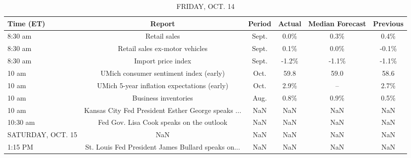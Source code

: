 \documentclass{article}%
\begin{document}
%


\begin{table}[htbp]%
\caption{FRIDAY, OCT. 14}%
\centering%
\begin{adjustbox}{width=1\textwidth}%
\begin{tabular}{lccccc}
\toprule
        Time (ET) &                                             Report & Period & Actual & Median Forecast & Previous \\
\midrule
          8:30 am &                                       Retail sales &  Sept. &   0.0\% &            0.3\% &     0.4\% \\
          8:30 am &                     Retail sales ex-motor vehicles &  Sept. &   0.1\% &            0.0\% &    -0.1\% \\
          8:30 am &                                 Import price index &  Sept. &  -1.2\% &           -1.1\% &    -1.1\% \\
            10 am &             UMich consumer sentiment index (early) &   Oct. &   59.8 &            59.0 &     58.6 \\
            10 am &        UMich 5-year inflation expectations (early) &   Oct. &   2.9\% &              -- &     2.7\% \\
            10 am &                               Business inventories &   Aug. &   0.8\% &            0.9\% &     0.5\% \\
            10 am & Kansas City Fed President Esther George speaks ... &    NaN &    NaN &             NaN &      NaN \\
         10:30 am &           Fed Gov. Lisa Cook speaks on the outlook &    NaN &    NaN &             NaN &      NaN \\
SATURDAY, OCT. 15 &                                                NaN &    NaN &    NaN &             NaN &      NaN \\
          1:15 PM & St. Louis Fed President James Bullard speaks on... &    NaN &    NaN &             NaN &      NaN \\
\bottomrule
\end{tabular}
%
\end{adjustbox}%
\end{table}
\end{document}

